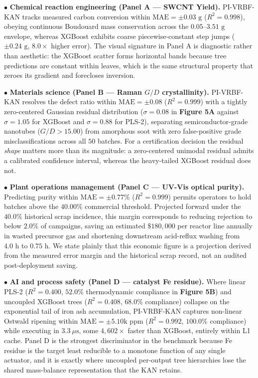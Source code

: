 \documentclass[10pt,journal,onecolumn]{IEEEtran}
\begin{document}
\noindent $\bullet$ \textbf{Chemical reaction engineering (Panel A — SWCNT Yield).} PI-VRBF-KAN tracks measured carbon conversion within $\text{MAE} = \pm 0.03\text{ g}$ ($R^2 = 0.998$), obeying continuous Boudouard mass conservation across the $0.05\text{--}3.51\text{ g}$ envelope, whereas XGBoost exhibits coarse piecewise-constant step jumps ($\pm 0.24\text{ g}$, $8.0\times$ higher error). The visual signature in Panel A is diagnostic rather than aesthetic: the XGBoost scatter forms horizontal bands because tree predictions are constant within leaves, which is the same structural property that zeroes its gradient and forecloses inversion.\par\smallskip
\noindent $\bullet$ \textbf{Materials science (Panel B — Raman $G/D$ crystallinity).} PI-VRBF-KAN resolves the defect ratio within $\text{MAE} = \pm 0.08$ ($R^2 = 0.999$) with a tightly zero-centered Gaussian residual distribution ($\sigma = 0.08$ in \textbf{Figure 5A} against $\sigma = 1.05$ for XGBoost and $\sigma = 0.88$ for PLS-2), separating semiconductor-grade nanotubes ($G/D > 15.00$) from amorphous soot with zero false-positive grade misclassifications across all $50$ batches. For a certification decision the residual \textit{shape} matters more than its magnitude: a zero-centered unimodal residual admits a calibrated confidence interval, whereas the heavy-tailed XGBoost residual does not.\par\smallskip
\noindent $\bullet$ \textbf{Plant operations management (Panel C — UV-Vis optical purity).} Predicting purity within $\text{MAE} = \pm 0.77\%$ ($R^2 = 0.999$) permits operators to hold batches above the $40.00\%$ commercial threshold. Projected forward under the $40.0\%$ historical scrap incidence, this margin corresponds to reducing rejection to below $2.0\%$ of campaigns, saving an estimated $\$180,000$ per reactor line annually in wasted precursor gas and shortening downstream acid-reflux washing from $4.0\text{ h}$ to $0.75\text{ h}$. We state plainly that this economic figure is a projection derived from the measured error margin and the historical scrap record, not an audited post-deployment saving.\par\smallskip
\noindent $\bullet$ \textbf{AI and process safety (Panel D — catalyst Fe residue).} Where linear PLS-2 ($R^2 = 0.400$, $52.0\%$ thermodynamic compliance in \textbf{Figure 5B}) and uncoupled XGBoost trees ($R^2 = 0.408$, $68.0\%$ compliance) collapse on the exponential tail of iron ash accumulation, PI-VRBF-KAN captures non-linear Ostwald ripening within $\text{MAE} = \pm 5.10\text{k ppm}$ ($R^2 = 0.992$, $100.0\%$ compliance) while executing in $3.3\ \mu\text{s}$, some $4,602\times$ faster than XGBoost, entirely within L1 cache. Panel D is the strongest discriminator in the benchmark because Fe residue is the target least reducible to a monotone function of any single actuator, and it is exactly where uncoupled per-output tree hierarchies lose the shared mass-balance representation that the KAN retains.\par\smallskip
\end{document}
